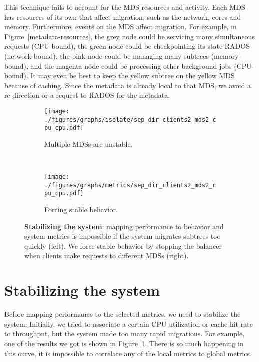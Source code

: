 This technique fails to account for the MDS resources and activity. Each MDS has resources of its own that affect migration, such as the network, cores and memory. Furthermore, events on the MDS affect migration. For example, in Figure~\ref{metadata-resources}, the grey node could be servicing many simultaneous requests (CPU-bound), the green node could be checkpointing its state RADOS (network-bound), the pink node could be managing many subtrees (memory-bound), and the magenta node could be processing other background jobs (CPU-bound). It may even be best to keep the yellow subtree on the yellow MDS because of caching. Since the metadata is already local to that MDS, we avoid a re-direction or a request to RADOS for the metadata. 

\begin{figure*}[tbh]
	\begin{subfigure}[H]{0.5\textwidth}
	\centering
	\texttt{[image: ./figures/graphs/isolate/sep\_dir\_clients2\_mds2\_cpu\_cpu.pdf]}
	\caption{Multiple MDSs are unstable.\label{unstable}}
	\end{subfigure}
	~
	\begin{subfigure}[H]{0.5\textwidth}
	\centering	
	\texttt{[image: ./figures/graphs/metrics/sep\_dir\_clients2\_mds2\_cpu\_cpu.pdf]} 
	\caption{Forcing stable behavior.\label{stable}}
	\end{subfigure}	
	\caption{\textbf{Stabilizing the system}: mapping performance to behavior and system metrics is impossible if the system migrates subtrees too quickly (left). We force stable behavior by stopping the balancer when clients make requests to different MDSs (right).\label{unstable-stable}}
\end{figure*}

\section{Stabilizing the system}
\label{results_stabilizing-the-system}

Before mapping performance to the selected metrics, we need to stabilize the system. Initially, we tried to associate a certain CPU utilization or cache hit rate to throughput, but the system made too many rapid migrations. For example, one of the results we got is shown in Figure~\ref{unstable}. There is so much happening in this curve, it is impossible to correlate any of the local metrics to global metrics.

